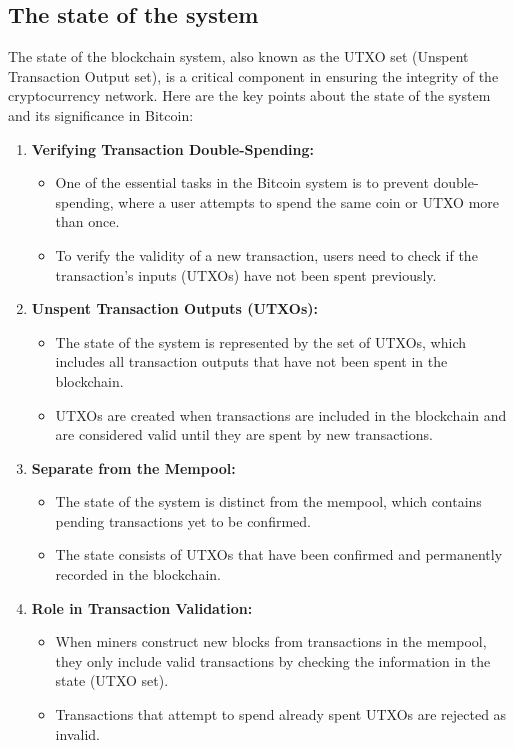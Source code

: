 \subsection{The state of the system}
The state of the blockchain system, also known as the UTXO set (Unspent Transaction Output set), is a critical component in ensuring the integrity of the cryptocurrency network. Here are the key points about the state of the system and its significance in Bitcoin:
\begin{enumerate}
	\item \textbf{Verifying Transaction Double-Spending:}
	\begin{itemize}
		\item One of the essential tasks in the Bitcoin system is to prevent double-spending, where a user attempts to spend the same coin or UTXO more than once.
		\item To verify the validity of a new transaction, users need to check if the transaction's inputs (UTXOs) have not been spent previously.
	\end{itemize}
	\item \textbf{Unspent Transaction Outputs (UTXOs):}
	\begin{itemize}
		\item The state of the system is represented by the set of UTXOs, which includes all transaction outputs that have not been spent in the blockchain.
		\item UTXOs are created when transactions are included in the blockchain and are considered valid until they are spent by new transactions.
	\end{itemize}
	\item \textbf{Separate from the Mempool:}
	\begin{itemize}
		\item The state of the system is distinct from the mempool, which contains pending transactions yet to be confirmed.
		\item The state consists of UTXOs that have been confirmed and permanently recorded in the blockchain.
	\end{itemize}
	\item \textbf{Role in Transaction Validation:}
	\begin{itemize}
		\item When miners construct new blocks from transactions in the mempool, they only include valid transactions by checking the information in the state (UTXO set).
		\item Transactions that attempt to spend already spent UTXOs are rejected as invalid.

\end{itemize}
\end{enumerate}
